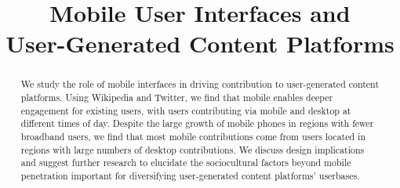 \documentclass{sigchi}
\begin{document}
\title{Mobile User Interfaces and\\User-Generated Content Platforms}


\maketitle

\begin{abstract}
We study the role of mobile interfaces in driving contribution to user-generated content platforms. Using Wikipedia and Twitter, we find that mobile enables deeper engagement for existing users, with users contributing via mobile and desktop at different times of day. Despite the large growth of mobile phones in regions with fewer broadband users, we find that most mobile contributions come from users located in regions with large numbers of desktop contributions. We discuss design implications and suggest further research to elucidate the sociocultural factors beyond mobile penetration important for diversifying user-generated content platforms' userbases.
\end{abstract}




\end{document}
